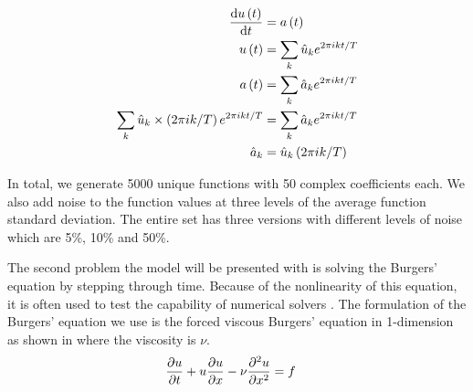\documentclass[preprint,12pt,times,authoryear]{elsarticle}
\begin{document}
\begin{align}
  \dv{u\left( t \right)}{t}                                        & = a\left(t\right) \label{eq:fourier_series_derivative}                                                            \\
  u\left( t \right)                                                & = \sum_{k} \hat{u}_k e^{2\pi ikt/T} \label{eq:fourier_speed}                                                      \\
  a\left( t \right)                                                & = \sum_{k} \hat{a}_k e^{2\pi ikt/T} \label{eq:fourier_acceleration}                                               \\
  \sum_{k} \hat{u}_k\times \left( 2\pi ik/T \right) e^{2\pi ikt/T} & = \sum_{k} \hat{a}_k e^{2\pi ikt/T} \label{eq:example_spectral_method_fourier_substituted}                        \\
  \hat{a}_k                                                        & = \hat{u}_k\left(2\pi ik/T \right)                                                    \label{eq:derivative_coeff}
\end{align}

In total, we generate \num{5000} unique functions with \num{50} complex coefficients each. We also add noise to the function values at three levels of the average function standard deviation. The entire set has three versions with different levels of noise which are 5\%, 10\% and 50\%.

The second problem the model will be presented with is solving the Burgers' equation by stepping through time. Because of the nonlinearity of this equation, it is often used to test the capability of numerical solvers \citep{woodExactSolutionBurgers2006,wazwazPartialDifferentialEquations2010,koprivaImplementingSpectralMethods2009}. The formulation of the Burgers' equation we use is the forced viscous Burgers' equation in 1-dimension as shown in  where the viscosity is \(\nu{}\).
\begin{align}
  \pdv{u}{t}+u\pdv{u}{x}-\nu\pdv[2]{u}{x} & = f \label{eq:forced_viscous_burgers}
\end{align}
\end{document}
